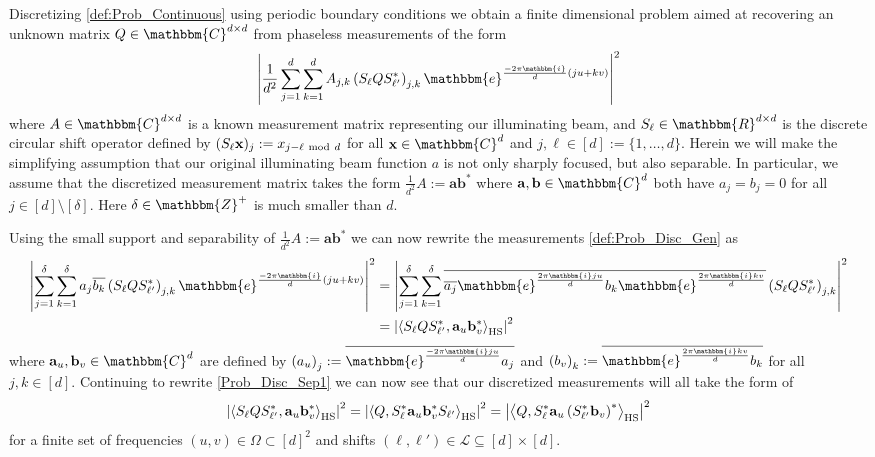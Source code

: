 \documentclass[]{spie}  %
\def \a {\mathbf a}
\def \b {\mathbf b}
\def \x {\mathbf x}
\def \HS {\rm HS}
\def \e { \mathbbm{e}}
\def \i { \mathbbm{i}}
\begin{document}
Discretizing \eqref{def:Prob_Continuous} using periodic boundary conditions we obtain a finite dimensional problem aimed at recovering an unknown matrix $Q \in \mathbbm{C}^{d \times d}$ from phaseless measurements of the form
\begin{equation}
\left| \frac{1}{d^2} \sum^d_{j=1} \sum^d_{k=1} A_{j,k} \left(S_{\ell}QS^*_{\ell'}\right)_{j,k} \e^{\frac{-2\pi \i}{d}(ju + kv)} \right|^2
\label{def:Prob_Disc_Gen}
\end{equation}
where $A \in \mathbbm{C}^{d \times d}$ is a known measurement matrix representing our illuminating beam, and $S_\ell \in \mathbbm{R}^{d \times d}$ is the discrete circular shift operator defined by $(S_\ell \x)_j := x_{j-\ell ~{\rm mod}~ d}$ for all $\x \in \mathbbm{C}^d$ and $j,\ell \in [d] := \{ 1, \dots, d\}$.  Herein we will make the simplifying assumption that our original illuminating beam function $a$ is not only sharply focused, but also separable.  In particular, we assume that the discretized measurement matrix takes the form $\frac{1}{d^2} A := \a \b^*$ where $\a,\b \in \mathbbm{C}^d$ both have $a_j = b_j = 0$ for all $j \in [d] \setminus [\delta]$.  Here $\delta \in \mathbbm{Z}^+$ is much smaller than $d$.

Using the small support and separability of $\frac{1}{d^2} A := \a \b^*$ we can now rewrite the measurements \eqref{def:Prob_Disc_Gen} as
\begin{align}
\left| \sum^\delta_{j=1} \sum^\delta_{k=1} a_j \overline{b_k} \left(S_{\ell}QS^*_{\ell'}\right)_{j,k} \e^{\frac{-2\pi \i}{d}(ju + kv)} \right|^2 &= \left| \sum^\delta_{j=1} \sum^\delta_{k=1} \overline{\overline{a_j}\e^{\frac{2 \pi \i j u}{d}}  b_k \e^{\frac{2 \pi \i k v}{d}}} \left(S_{\ell}QS^*_{\ell'}\right)_{j,k} \right|^2 \nonumber \\
&= \left| \left\langle S_{\ell}QS^*_{\ell'}, \a_u \b^*_v \right\rangle_{\HS} \right|^2
\label{Prob_Disc_Sep1}
\end{align}
where $\a_u, \b_v \in \mathbbm{C}^d$ are defined by $\left( a_u \right)_j := \overline{\e^{\frac{-2 \pi \i j u}{d}} a_j}$ and $\left( b_v \right)_k := \overline{\e^{\frac{2 \pi \i k v}{d}} b_k}$ for all $j,k \in [d]$.  Continuing to rewrite \eqref{Prob_Disc_Sep1} we can now see that our discretized measurements will all take the form of 
\begin{equation}
\left| \left\langle S_{\ell}QS^*_{\ell'}, \a_u \b^*_v \right\rangle_{\HS} \right|^2 = \left| \left\langle Q, S_\ell^* \a_u \b^*_v S_{\ell'} \right\rangle_{\HS} \right|^2 = \left| \left\langle Q, S^*_{\ell} \a_u \left(S^*_{\ell'} \b_v \right)^* \right\rangle_{\HS} \right|^2
\label{Prob_Disc}
\end{equation}
for a finite set of frequencies $(u,v) \in \Omega \subset [d]^2$ and shifts $(\ell,\ell') \in \mathcal{L} \subseteq [d] \times [d]$.
\end{document}
